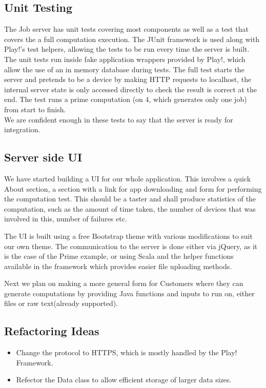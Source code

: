 \documentclass[a4paper,10pt]{article}
\begin{document}
\subsection{Unit Testing}

The Job server has unit tests covering most components as well as a test that covers the a full computation execution.
The JUnit framework is used along with Play!'s test helpers, allowing the tests to be run every time the server is built.\\
The unit tests run inside fake application wrappers provided by Play!, which allow the use of an in memory database during tests.
The full test starts the server and pretends to be a device by making HTTP requests to localhost,
the internal server state is only accessed directly to check the result is correct at the end.
The test runs a prime computation (on 4, which generates only one job) from start to finish.\\

We are confident enough in these tests to say that the server is ready for integration.

\subsection{Server side UI}
We have started building a UI for our whole application. This involves a quick About section, a section with a link for app downloading and form for performing the computation test. This should be a taster and shall produce statistics of the computation, such as the amount of time taken, the number of devices that was involved in this, number of failures etc. 

The UI is built using a free Bootstrap theme with various modifications to suit our own theme. The communication to the server is done either via jQuery, as it is the case of the Prime example, or using Scala and the helper functions available in the framework which provides easier file uploading methods. 

Next we plan on making a more general form for Customers where they can generate computations by providing Java functions and inputs to run on, either files or raw text(already supported).

\subsection{Refactoring Ideas}

\begin{itemize}
\item Change the protocol to HTTPS, which is mostly handled by the Play! Framework.
\item Refector the Data class to allow efficient storage of larger data sizes.
\end{itemize}
\end{document}
